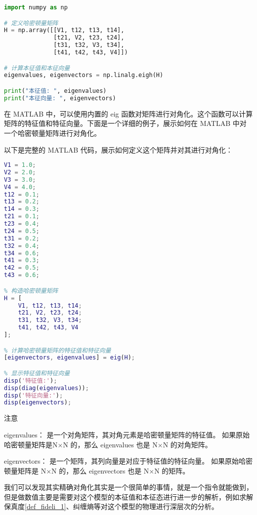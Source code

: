 \begin{lstlisting}[language=python]
import numpy as np

# 定义哈密顿量矩阵
H = np.array([[V1, t12, t13, t14],
              [t21, V2, t23, t24],
              [t31, t32, V3, t34],
              [t41, t42, t43, V4]])

# 计算本征值和本征向量
eigenvalues, eigenvectors = np.linalg.eigh(H)

print("本征值: ", eigenvalues)
print("本征向量: ", eigenvectors)

\end{lstlisting}
在 MATLAB 中，可以使用内置的 eig 函数对矩阵进行对角化。这个函数可以计算矩阵的特征值和特征向量。下面是一个详细的例子，展示如何在 MATLAB 中对一个哈密顿量矩阵进行对角化。

以下是完整的 MATLAB 代码，展示如何定义这个矩阵并对其进行对角化：

\begin{lstlisting}[language=matlab]
% 定义哈密顿量矩阵的元素
V1 = 1.0;
V2 = 2.0;
V3 = 3.0;
V4 = 4.0;
t12 = 0.1;
t13 = 0.2;
t14 = 0.3;
t21 = 0.1;
t23 = 0.4;
t24 = 0.5;
t31 = 0.2;
t32 = 0.4;
t34 = 0.6;
t41 = 0.3;
t42 = 0.5;
t43 = 0.6;

% 构造哈密顿量矩阵
H = [
    V1, t12, t13, t14;
    t21, V2, t23, t24;
    t31, t32, V3, t34;
    t41, t42, t43, V4
];

% 计算哈密顿量矩阵的特征值和特征向量
[eigenvectors, eigenvalues] = eig(H);

% 显示特征值和特征向量
disp('特征值:');
disp(diag(eigenvalues));
disp('特征向量:');
disp(eigenvectors);

\end{lstlisting}
注意

eigenvalues：
是一个对角矩阵，其对角元素是哈密顿量矩阵的特征值。
如果原始哈密顿量矩阵是N×N 的，那么 eigenvalues 也是 N×N 的对角矩阵。

eigenvectors：
是一个矩阵，其列向量是对应于特征值的特征向量。
如果原始哈密顿量矩阵是 N×N 的，那么 eigenvectors 也是 N×N 的矩阵。

我们可以发现其实精确对角化其实是一个很简单的事情，就是一个指令就能做到，但是做数值主要是需要对这个模型的本征值和本征态进行进一步的解析，例如求解保真度\autoref{def_fideli_1}、纠缠熵等对这个模型的物理进行深层次的分析。